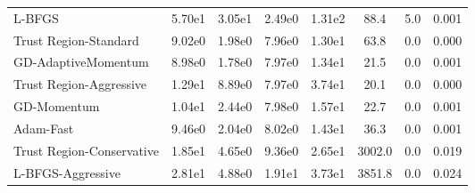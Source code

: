 \documentclass{article}
\begin{document}
\begin{table}[htbp]
{\begin{tabular}{p{2.5cm}*{7}{c}}
L-BFGS & 5.70e1 & 3.05e1 & 2.49e0 & 1.31e2 & 88.4 & 5.0 & 0.001 \\
Trust Region-Standard & 9.02e0 & 1.98e0 & 7.96e0 & 1.30e1 & 63.8 & 0.0 & 0.000 \\
GD-AdaptiveMomentum & 8.98e0 & 1.78e0 & 7.97e0 & 1.34e1 & 21.5 & 0.0 & 0.001 \\
Trust Region-Aggressive & 1.29e1 & 8.89e0 & 7.97e0 & 3.74e1 & 20.1 & 0.0 & 0.000 \\
GD-Momentum & 1.04e1 & 2.44e0 & 7.98e0 & 1.57e1 & 22.7 & 0.0 & 0.001 \\
Adam-Fast & 9.46e0 & 2.04e0 & 8.02e0 & 1.43e1 & 36.3 & 0.0 & 0.001 \\
Trust Region-Conservative & 1.85e1 & 4.65e0 & 9.36e0 & 2.65e1 & 3002.0 & 0.0 & 0.019 \\
L-BFGS-Aggressive & 2.81e1 & 4.88e0 & 1.91e1 & 3.73e1 & 3851.8 & 0.0 & 0.024 \\
\bottomrule
\end{tabular}
}
\end{table}
\end{document}
